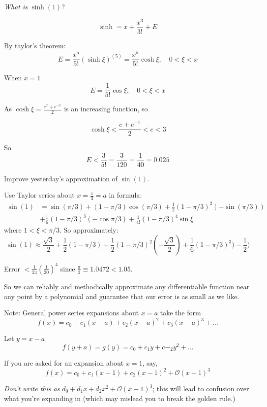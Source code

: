 \documentclass[10pt]{scrartcl}
\begin{document}
\begin{example}
\emph{What is $\sinh(1)$}?

\[\sinh = x + \frac{x^3}{3!} + E\]

By taylor's theorem:
\[E = \frac{x^5}{5!}(\sinh\xi)^{(5)} = \frac{x^5}{5!}\cosh \xi, \quad 0 < \xi < x\]

When $x = 1$
\[E = \frac{1}{5!}\cos \xi, \quad 0 < \xi < x\]

As $\cosh\xi = \frac{e^x + e^{-x}}{2}$ is an increasing function, so 

\[\cosh\xi < \frac{e + e^{-1}}{2} < e < 3\]

So 
\[E < \frac{3}{5!} = \frac{3}{120} = \frac{1}{40} = 0.025\]
\end{example}\vspace*{10pt}


\begin{example}
Improve yesterday's approximation of $\sin(1)$. 

Use Taylor series about $x = \frac{\pi}{3} = a$ in formula: 
\[
\begin{aligned}
  \sin(1) &= \sin(\pi/3) + (1-\pi/3)\cos(\pi/3) + \frac{1}{2}(1-\pi/3)^2(-\sin(\pi/3))\\
   &+ \frac{1}{6}(1-\pi/3)^3(-\cos\pi/3) + \frac{1}{4!}(1-\pi/3)^4\sin\xi
\end{aligned}
\]
where $1 < \xi < \pi/3$. So approximately: 
\[\sin(1) \approx \frac{\sqrt{3}}{2} + \frac{1}{2}(1-\pi/3) + \frac{1}{2}(1-\pi/3)^2(-\frac{\sqrt{3}}{2}) + \frac{1}{6}(1-\pi/3)^3)-\frac{1}{2})\]

Error $< \frac{1}{24}(\frac{1}{20})^4$ since $\frac{\pi}{3} \equiv 1.0472 < 1.05$. 
\end{example}

So we can reliably and methodically approximate any differentiable function near any point by a polynomial and guarantee that our error is as small as we like. 

Note: General power series expansions about $x = a$ take the form
\[f(x) = c_0 + c_1(x-a) + c_2(x-a)^2 + c_3(x-a)^3 + \dots\]

Let $y = x-a$
\[f(y+a) = g(y) = c_0 + c_1y + c-_2y^2 + \dots\]

If you are asked for an expansion about $x=1$, say, 
\[f(x) = c_0 + c_1(x-1) + c_2(x-1)^2 + \mathcal{O}(x-1)^3\]

\emph{Don't write this as} $d_0 + d_1x + d_2x^2 + \mathcal{O}(x-1)^3$; this will lead to confusion over what you're expanding in (which may mislead you to break the golden rule.)
\end{document}
